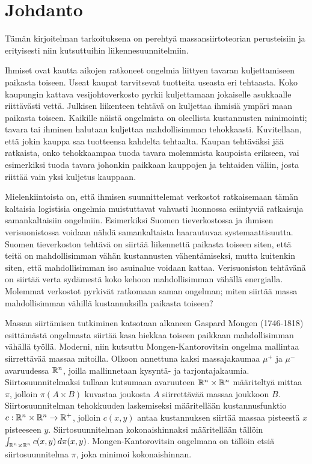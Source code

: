 \documentclass[12pt,oneside,a4paper]{amsbook} %
\begin{document}
\pagebreak

\chapter*{Johdanto}
%
Tämän kirjoitelman tarkoituksena on perehtyä massansiirtoteorian perusteisiin ja erityisesti niin kutsuttuihin liikennesuunnitelmiin. 

Ihmiset ovat kautta aikojen ratkoneet ongelmia liittyen tavaran kuljettamiseen paikasta toiseen. Useat kaupat tarvitsevat tuotteita useasta eri tehtaasta. Koko kaupungin kattava vesijohtoverkosto pyrkii kuljettamaan jokaiselle asukkaalle riittävästi vettä. Julkisen liikenteen tehtävä on kuljettaa ihmisiä ympäri maan paikasta toiseen. Kaikille näistä ongelmista on oleellista kustannusten minimointi; tavara tai ihminen halutaan kuljettaa mahdollisimman tehokkaasti. Kuvitellaan, että jokin kauppa saa tuotteensa kahdelta tehtaalta. Kaupan tehtäväksi jää ratkaista, onko tehokkaampaa tuoda tavara molemmista kaupoista erikseen, vai esimerkiksi tuoda tavara johonkin paikkaan kauppojen ja tehtaiden väliin, josta riittää vain yksi kuljetus kauppaan.

Mielenkiintoista on, että ihmisen suunnittelemat verkostot ratkaisemaan tämän kaltaisia logistisia ongelmia muistuttavat vahvasti luonnossa esiintyviä ratkaisuja samankaltaisiin ongelmiin. Esimerkiksi Suomen tieverkostossa ja ihmisen verisuonistossa voidaan nähdä samankaltaista haarautuvaa systemaattisuutta. Suomen tieverkoston tehtävä on siirtää liikennettä paikasta toiseen siten, että teitä on mahdollisimman vähän kustannusten vähentämiseksi, mutta kuitenkin siten, että mahdollisimman iso asuinalue voidaan kattaa. Verisuoniston tehtävänä on siirtää verta sydämestä koko kehoon mahdollisimman vähällä energialla. Molemmat verkostot pyrkivät ratkomaan saman ongelman; miten siirtää massa mahdollisimman vähillä kustannuksilla paikasta toiseen? 

Massan siirtämisen tutkiminen katsotaan alkaneen Gaspard Mongen (1746-1818) esittämästä ongelmasta \cite{monge} siirtää kasa hiekkaa toiseen paikkaan mahdollisimman vähällä työllä. Moderni, niin kutsuttu Mongen-Kantorovitsin ongelma mallintaa siirrettävää massaa mitoilla. Olkoon annettuna kaksi massajakaumaa $\mu^+$ ja $\mu^-$ avaruudessa $\mathbb{R}^n$, joilla mallinnetaan kysyntä- ja tarjontajakaumia. Siirtosuunnitelmaksi tullaan kutsumaan avaruuteen $\mathbb{R}^n \times \mathbb{R}^n$ määriteltyä mittaa $\pi$, jolloin $\pi(A\times B)$ kuvastaa joukosta $A$ siirrettävää massaa joukkoon $B$. Siirtosuunnitelman tehokkuuden laskemiseksi määritellään kustannusfunktio $c:\mathbb{R}^n\times \mathbb{R}^n \to {\mathbb{R}^{+}}$, jolloin $c(x, y)$ antaa kustannuksen siirtää massaa pisteestä $x$ pisteeseen $y$. Siirtosuunnitelman kokonaishinnaksi määritellään tällöin $\int_{\mathbb{R}^n\times \mathbb{R}^n} c(x, y) \, d\pi(x, y)$. Mongen-Kantorovitsin ongelmana on tällöin etsiä siirtosuunnitelma $\pi$, joka minimoi kokonaishinnan. \cite[s. 11]{optimal}
\end{document}

